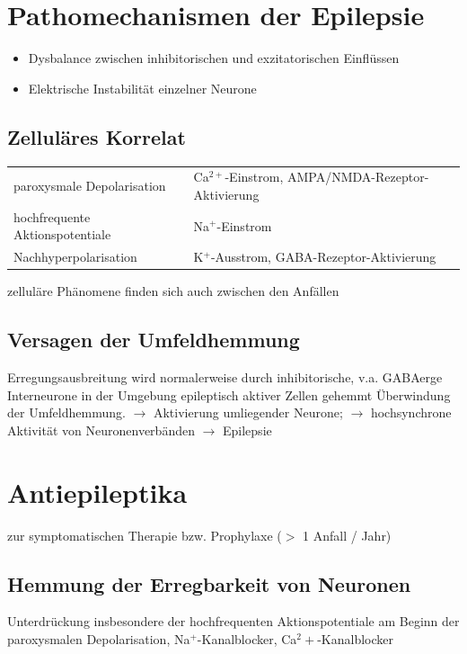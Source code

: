 \documentclass[10pt,a4paper]{report}
\begin{document}
\section{Pathomechanismen der Epilepsie} %
\label{sec:pathomechanismen_der_epilepsie}
\begin{itemize}
	\item Dysbalance zwischen inhibitorischen und exzitatorischen Einflüssen
	\item Elektrische Instabilität einzelner Neurone
\end{itemize}
\subsection{Zelluläres Korrelat} %
\label{sub:zellul_res_korrelat}
\begin{tabularx}{\textwidth}{XX}
paroxysmale Depolarisation&Ca$^{2+}$-Einstrom, AMPA/NMDA-Rezeptor-Aktivierung\\
hochfrequente Aktionspotentiale&Na$^+$-Einstrom\\
Nachhyperpolarisation&K$^+$-Ausstrom, GABA-Rezeptor-Aktivierung\\
\end{tabularx}
zelluläre Phänomene finden sich auch zwischen den Anfällen
\subsection{Versagen der Umfeldhemmung} %
\label{sub:versagen_der_umfeldhemmung}
Erregungsausbreitung wird normalerweise durch inhibitorische, v.a. GABAerge Interneurone in der Umgebung epileptisch aktiver Zellen gehemmt
Überwindung der Umfeldhemmung.
$\rightarrow$ 	Aktivierung umliegender Neurone; $\rightarrow$ 	hochsynchrone Aktivität von Neuronenverbänden $\rightarrow$ Epilepsie
\section{Antiepileptika} %
\label{sec:antiepileptika}
zur symptomatischen Therapie bzw. Prophylaxe ($>$ 1 Anfall / Jahr)
\subsection{Hemmung der Erregbarkeit von Neuronen} %
\label{sub:hemmung_der_erregbarkeit_von_neuronen}
Unterdrückung insbesondere der hochfrequenten Aktionspotentiale am Beginn der paroxysmalen Depolarisation, Na$^+$-Kanalblocker, Ca$^2+$-Kanalblocker
\end{document}
